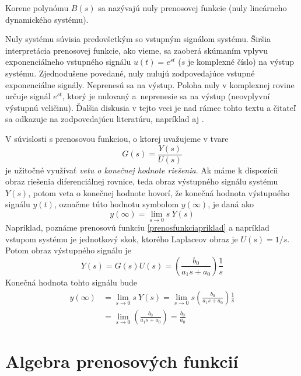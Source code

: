 \documentclass[a4paper, 10pt, ]{article}
\begin{document}
Korene polynómu $B(s)$ sa nazývajú nuly prenosovej funkcie (nuly lineárneho dynamického systému).

Nuly systému súvisia predovšetkým so vstupným signálom systému. Širšia interpretácia prenosovej funkcie, ako vieme, sa zaoberá skúmaním vplyvu exponenciálneho vstupného signálu $u(t) = e^{st}$ ($s$ je komplexné číslo) na výstup systému. Zjednodušene povedané, nuly nulujú zodpovedajúce vstupné exponenciálne signály. Neprenesú sa na výstup. Poloha nuly v komplexnej rovine určuje signál $e^{st}$, ktorý je nulovaný a~neprenesie sa na výstup (neovplyvní výstupnú veličinu). Ďalšia diskusia v tejto veci je nad rámec tohto textu a čitateľ sa odkazuje na zodpovedajúcu literatúru, napríklad aj \cite{Aastroem2020}.

V súvislosti s prenosovou funkciou, o ktorej uvažujeme v tvare
\begin{equation}
    G(s) = \frac{Y(s)}{U(s)}
\end{equation}
je užitočné využívať \emph{vetu o konečnej hodnote riešenia}. Ak máme k dispozícii obraz riešenia diferenciálnej rovnice, teda obraz výstupného signálu systému $Y(s)$, potom veta o konečnej hodnote hovorí, že konečná hodnota výstupného signálu $y(t)$, označme túto hodnotu symbolom $y(\infty)$, je daná ako
\begin{equation}
    y(\infty) = \lim_{s \to 0} s\ Y(s)   
\end{equation}
Napríklad, poznáme prenosovú funkciu \eqref{prenosfunkciapriklad} a napríklad vstupom systému je jednotkový skok, ktorého Laplaceov obraz je $U(s) = 1/s$. Potom obraz výstupného signálu je
\begin{equation}
    Y(s) = G(s) U(s) = \left( \frac{b_0}{a_1 s + a_0} \right) \frac{1}{s}  
\end{equation}
Konečná hodnota tohto signálu bude
\begin{subequations}
    \begin{align}
        y(\infty) &= \lim_{s \to 0} s\ Y(s) = \lim_{s \to 0} s \left( \frac{b_0}{a_1 s + a_0} \right) \frac{1}{s} 
        \\
        &= \lim_{s \to 0} \left( \frac{b_0}{a_1 s + a_0} \right) = \frac{b_0}{a_0}        
    \end{align}
\end{subequations}





\section{Algebra prenosových funkcií}
\end{document}
